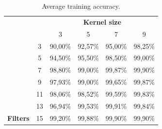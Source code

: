 \begin{table}[ht!]
	\centering
	\begin{tabular}{cccccc}
		&                                                 & \multicolumn{4}{c}{\textbf{Kernel size}} \\
		& \multicolumn{1}{c|}{}                           & 3                               & 5                               & 7                               & 9                               \\ \cline{2-6} 
		& \multicolumn{1}{c|}{3}                          & 90,00\%                         & 92,57\%                         & 95,00\%                         & 98,25\%                         \\
		& \multicolumn{1}{c|}{\cellcolor[HTML]{EFEFEF}5}  & \cellcolor[HTML]{EFEFEF}94,50\% & \cellcolor[HTML]{EFEFEF}95,50\% & \cellcolor[HTML]{EFEFEF}98,50\% & \cellcolor[HTML]{EFEFEF}99,00\% \\
		& \multicolumn{1}{c|}{7}                          & 98,80\%                         & 99,00\%                         & 99,87\%                         & 99,90\%                         \\
		& \multicolumn{1}{c|}{\cellcolor[HTML]{EFEFEF}9}  & \cellcolor[HTML]{EFEFEF}97,93\% & \cellcolor[HTML]{EFEFEF}99,00\% & \cellcolor[HTML]{EFEFEF}99,65\% & \cellcolor[HTML]{EFEFEF}99,87\% \\
		& \multicolumn{1}{c|}{11}                         & 98,06\%                         & 98,52\%                         & 99,59\%                         & 99,83\%                         \\
		& \multicolumn{1}{c|}{\cellcolor[HTML]{EFEFEF}13} & \cellcolor[HTML]{EFEFEF}96,94\% & \cellcolor[HTML]{EFEFEF}99,53\% & \cellcolor[HTML]{EFEFEF}99,91\% & \cellcolor[HTML]{EFEFEF}99,84\% \\
		\multirow{-7}{*}{\textbf{Filters}} & \multicolumn{1}{c|}{15}                         & 99,20\%                         & 99,88\%                         & 99,90\%                         & 99,90\%                        
	\end{tabular}
	\caption{Average training accuracy.}
\end{table}

